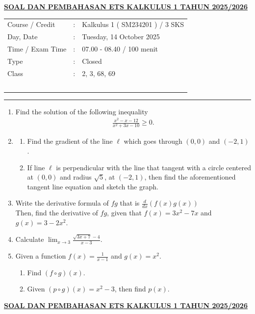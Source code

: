 \documentclass[10pt,openany,a4paper]{article}
\theoremstyle{definition}
\theoremstyle{definition}
\theoremstyle{plain}
\begin{document}
\newpage
 \begin{center}
	{\underline{\textbf{\MakeUppercase{Soal dan Pembahasan ETS Kalkulus 1 Tahun 2025/2026}}}}
    \end{center}

    \begin{center}
	\begin{tabular}{lcl}
		Course / Credit & : & Kalkulus 1 ( SM234201 ) / 3 SKS\\
		Day, Date & : & Tuesday, 14 October 2025\\
		Time / Exam Time & : & 07.00 - 08.40 / 100 menit\\
		Type & : & Closed\\
		Class & : & 2, 3, 68, 69\\
  ~
	\end{tabular}
    
    \noindent\rule{\textwidth}{2.pt}
        \end{center}
        \begin{enumerate}
            \item Find the solution of the following inequality 
            \begin{align*}
                \frac{x^2-x-12}{x^2+3x-10}\geq 0.
            \end{align*}
            \item \begin{enumerate}
                \item Find the gradient of the line $\ell$ which goes through $(0,0)$ and $(-2,1)$.
                \item If line $\ell$ is perpendicular with the line that tangent with a circle centered at $(0,0)$ and radius $\sqrt{5}$, at $(-2,1)$, then find the aforementioned tangent line equation and sketch the graph. 
            \end{enumerate}
            \item Write the derivative formula of $fg$ that is $\frac{d}{dx}(f(x)g(x))$\\
            Then, find the derivative of $fg$, given that $f(x)=3x^2-7x$ and $g(x)=3-2x^2$.
            \item Calculate $\displaystyle \lim_{x\to 3} \frac{\sqrt{3x+7}-4}{x-3}$.
            \item Given a function $f(x)=\frac{1}{x-1}$ and $g(x)=x^2$. 
            \begin{enumerate}
                \item Find $(f\circ g)(x)$.
                \item Given $(p\circ g)(x)=  x^2-3$, then find $p(x)$.
            \end{enumerate}
        \end{enumerate}
               \newpage
 \begin{center}
	{\underline{\textbf{\MakeUppercase{Soal dan Pembahasan ETS Kalkulus 1 Tahun 2025/2026}}}}
    \end{center}
\end{document}
